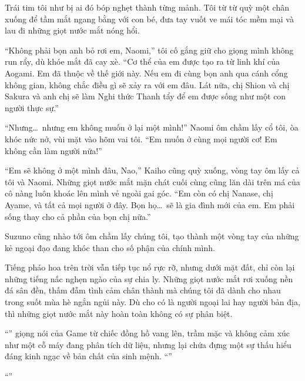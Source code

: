 \documentclass[../main.tex]{subfiles}
\begin{document}
Trái tim tôi như bị ai đó bóp nghẹt thành từng mảnh. Tôi từ từ quỳ một chân xuống để tầm mắt ngang bằng với con bé, đưa tay vuốt ve mái tóc mềm mại và lau đi những giọt nước mắt nóng hổi.

``Không phải bọn anh bỏ rơi em, Naomi,'' tôi cố gắng giữ cho giọng mình không run rẩy, dù khóe mắt đã cay xè. ``Cơ thể của em được tạo ra từ linh khí của Aogami. Em đã thuộc về thế giới này. Nếu em đi cùng bọn anh qua cánh cổng không gian, không chắc điều gì sẽ xảy ra với em đâu. Lát nữa, chị Shion và chị Sakura và anh chị sẽ làm Nghi thức Thanh tẩy để em được sống như một con người thực sự.''

``Nhưng\dots\ nhưng em không muốn ở lại một mình!'' Naomi ôm chầm lấy cổ tôi, òa khóc nức nở, vùi mặt vào hõm vai tôi. ``Em muốn ở cùng mọi người cơ! Em không cần làm người nữa!''

``Em sẽ không ở một mình đâu, Nao,'' Kaiho cũng quỳ xuống, vòng tay ôm lấy cả tôi và Naomi. Những giọt nước mắt mặn chát cuối cùng cũng lăn dài trên má của cô nàng luôn khoác lên mình vẻ ngoài gai góc. ``Em còn có chị Nanase, chị Ayame, và tất cả mọi người ở đây. Bọn họ\dots\ sẽ là gia đình mới của em. Em phải sống thay cho cả phần của bọn chị nữa.''

Suzuno cũng nhào tới ôm chầm lấy chúng tôi, tạo thành một vòng tay của những kẻ ngoại đạo đang khóc than cho số phận của chính mình.

Tiếng pháo hoa trên trời vẫn tiếp tục nổ rực rỡ, nhưng dưới mặt đất, chỉ còn lại những tiếng nấc nghẹn ngào của sự chia ly. Những giọt nước mắt rơi xuống nền đá sân đền, thấm đẫm tình cảm chân thành mà chúng tôi đã dành cho nhau trong suốt mùa hè ngắn ngủi này. Dù cho có là người ngoại lai hay người bản địa, thì những giọt nước mắt này hoàn toàn không có sự phân biệt.

``'' giọng nói của Game từ chiếc đồng hồ vang lên, trầm mặc và không cảm xúc như một cỗ máy đang phân tích dữ liệu, nhưng lại chứa đựng một sự thấu hiểu đáng kinh ngạc về bản chất của sinh mệnh. ``''

``''
\end{document}
